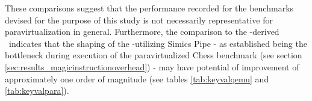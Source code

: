 \noindent
These comparisons suggest that the performance recorded for the benchmarks devised for the purpose of this study is not necessarily representative for paravirtualization in general.
Furthermore, the comparison to the \dvttermqemu -derived \dvttermandroidemulator\ indicates that the shaping of the \dvttermmagicinstruction -utilizing Simics Pipe - as established being the bottleneck during execution of the paravirtualized Chess benchmark (see section \ref{sec:results_magicinstructionoverhead}) - may have potential of improvement of approximately one order of magnitude (see tables \ref{tab:keyvalqemu} and \ref{tab:keyvalpara}).
